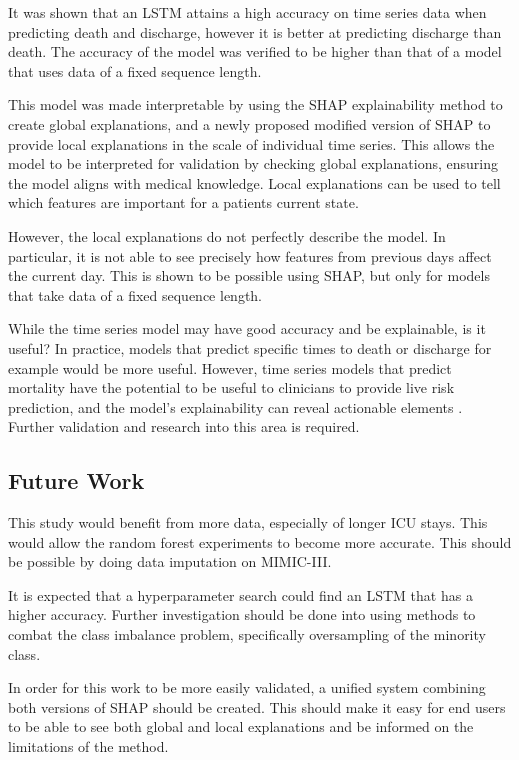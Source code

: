 \documentclass[12pt]{article}
\begin{document}
It was shown that an LSTM attains a high accuracy on time series data when predicting death and discharge, however it is better at predicting discharge than death. The accuracy of the model was verified to be higher than that of a model that uses data of a fixed sequence length.

This model was made interpretable by using the SHAP explainability method to create global explanations, and a newly proposed modified version of SHAP to provide local explanations in the scale of individual time series. This allows the model to be interpreted for validation by checking global explanations, ensuring the model aligns with medical knowledge. Local explanations can be used to tell which features are important for a patients current state. 

However, the local explanations do not perfectly describe the model. In particular, it is not able to see precisely how features from previous days affect the current day. This is shown to be possible using SHAP, but only for models that take data of a fixed sequence length. 

While the time series model may have good accuracy and be explainable, is it useful? In practice, models that predict specific times to death or discharge for example would be more useful. However, time series models that predict mortality have the potential to be useful to clinicians to provide live risk prediction, and the model's explainability can reveal actionable elements \cite{ICUFancyLSTM}. Further validation and research into this area is required. 

\subsection{Future Work}

This study would benefit from more data, especially of longer ICU stays. This would allow the random forest experiments to become more accurate. This should be possible by doing data imputation on MIMIC-III. 

It is expected that a hyperparameter search could find an LSTM that has a higher accuracy. Further investigation should be done into using methods to combat the class imbalance problem, specifically oversampling of the minority class.

In order for this work to be more easily validated, a unified system combining both versions of SHAP should be created. This should make it easy for end users to be able to see both global and local explanations and be informed on the limitations of the method.
\end{document}
